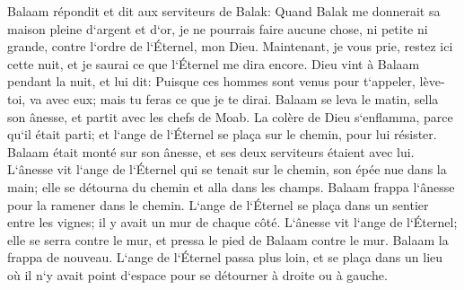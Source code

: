 \verse Balaam répondit et dit aux serviteurs de Balak: Quand Balak me donnerait sa maison pleine d`argent et d`or, je ne pourrais faire aucune chose, ni petite ni grande, contre l`ordre de l`Éternel, mon Dieu. 
\verse Maintenant, je vous prie, restez ici cette nuit, et je saurai ce que l`Éternel me dira encore. 
\verse Dieu vint à Balaam pendant la nuit, et lui dit: Puisque ces hommes sont venus pour t`appeler, lève-toi, va avec eux; mais tu feras ce que je te dirai. 
\verse Balaam se leva le matin, sella son ânesse, et partit avec les chefs de Moab. 
\verse La colère de Dieu s`enflamma, parce qu`il était parti; et l`ange de l`Éternel se plaça sur le chemin, pour lui résister. Balaam était monté sur son ânesse, et ses deux serviteurs étaient avec lui. 
\verse L`ânesse vit l`ange de l`Éternel qui se tenait sur le chemin, son épée nue dans la main; elle se détourna du chemin et alla dans les champs. Balaam frappa l`ânesse pour la ramener dans le chemin. 
\verse L`ange de l`Éternel se plaça dans un sentier entre les vignes; il y avait un mur de chaque côté. 
\verse L`ânesse vit l`ange de l`Éternel; elle se serra contre le mur, et pressa le pied de Balaam contre le mur. Balaam la frappa de nouveau. 
\verse L`ange de l`Éternel passa plus loin, et se plaça dans un lieu où il n`y avait point d`espace pour se détourner à droite ou à gauche. 
